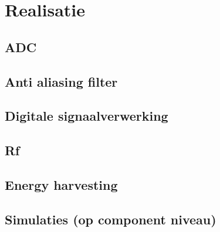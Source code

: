 \section{Realisatie}



\subsection{ADC}

\subsection{Anti aliasing filter}

\subsection{Digitale signaalverwerking}

\subsection{Rf}

\subsection{Energy harvesting}

\subsection{Simulaties (op component niveau)}
